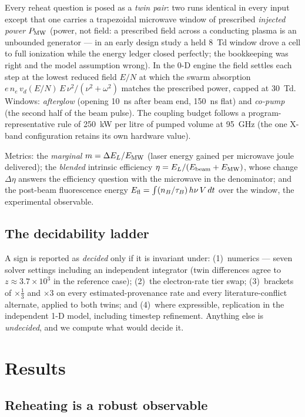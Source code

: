 \documentclass[aps,pra,preprint,longbibliography,nofootinbib]{revtex4-2}
\begin{document}
Every reheat question is posed as a \emph{twin pair}: two runs
identical in every input except that one carries a trapezoidal
microwave window of prescribed \emph{injected power} $P_{\rm MW}$
(power, not field: a prescribed field across a conducting plasma is an
unbounded generator --- in an early design study a held 8~Td window
drove a cell to full ionization while the energy ledger closed
perfectly; the bookkeeping was right and the model assumption wrong).
In the 0-D engine the field settles each step at the lowest reduced
field $E/N$ at which the swarm absorption
$e\,n_e\,v_d(E/N)\,E\,\nu^2/(\nu^2+\omega^2)$ matches the prescribed
power, capped at 30~Td. Windows: \emph{afterglow} (opening 10~ns after
beam end, 150~ns flat) and \emph{co-pump} (the second half of the beam
pulse). The coupling budget follows a program-representative rule of
250~kW per litre of pumped volume at 95~GHz (the one X-band
configuration retains its own hardware value).

Metrics: the \emph{marginal} $m=\Delta E_L/E_{\rm MW}$ (laser energy
gained per microwave joule delivered); the \emph{blended} intrinsic
efficiency $\eta=E_L/(E_{\rm beam}+E_{\rm MW})$, whose change
$\Delta\eta$ answers the efficiency question with the microwave in the
denominator; and the post-beam fluorescence energy
$E_{\rm fl}=\int (n_{B}/\tau_{B})\,h\nu\,V\,dt$ over the window, the
experimental observable.

\subsection{The decidability ladder}

A sign is reported as \emph{decided} only if it is invariant under:
(1)~numerics --- seven solver settings including an independent
integrator (twin differences agree to $z\approx3.7\times10^3$ in the
reference case); (2)~the electron-rate tier swap; (3)~brackets of
$\times\tfrac13$ and $\times3$ on every estimated-provenance rate and
every literature-conflict alternate, applied to both twins; and
(4)~where expressible, replication in the independent 1-D model,
including timestep refinement. Anything else is \emph{undecided}, and
we compute what would decide it.

\section{Results}

\subsection{Reheating is a robust observable}
\label{sec:observable}
\end{document}
